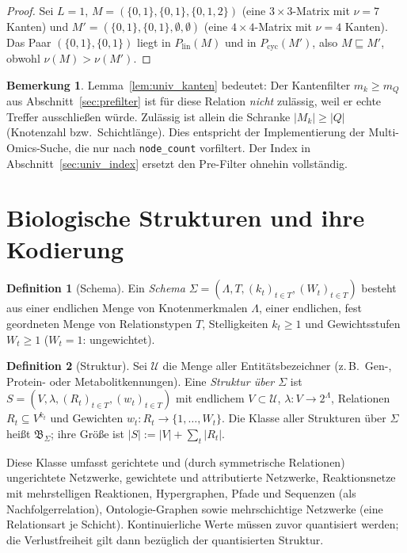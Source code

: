 \documentclass[a4paper,12pt, twoside]{report}
\theoremstyle{definition}
\newtheorem{definition}{Definition}
\newtheorem{bemerkung}{Bemerkung}
\begin{document}
\begin{proof}
	Sei $L=1$, $M=(\{0,1\},\{0,1\},\{0,1,2\})$ (eine $3\times3$-Matrix mit $\nu=7$ Kanten) und $M'=(\{0,1\},\{0,1\},\emptyset,\emptyset)$ (eine $4\times4$-Matrix mit $\nu=4$ Kanten). Das Paar $(\{0,1\},\{0,1\})$ liegt in $P_{\mathrm{lin}}(M)$ und in $P_{\mathrm{cyc}}(M')$, also $M\sqsubseteq M'$, obwohl $\nu(M)>\nu(M')$.
\end{proof}

\begin{bemerkung}
	Lemma~\ref{lem:univ_kanten} bedeutet: Der Kantenfilter $m_k\ge m_Q$ aus Abschnitt~\ref{sec:prefilter} ist für diese Relation \emph{nicht} zulässig, weil er echte Treffer ausschließen würde. Zulässig ist allein die Schranke $|M_k|\ge|Q|$ (Knotenzahl bzw.\ Schichtlänge). Dies entspricht der Implementierung der Multi-Omics-Suche, die nur nach \texttt{node\_count} vorfiltert. Der Index in Abschnitt~\ref{sec:univ_index} ersetzt den Pre-Filter ohnehin vollständig.
\end{bemerkung}

\section{Biologische Strukturen und ihre Kodierung}
\label{sec:univ_kodierung}

\begin{definition}[Schema]
	Ein \emph{Schema} $\Sigma=(\Lambda,T,(k_t)_{t\in T},(W_t)_{t\in T})$ besteht aus einer endlichen Menge von Knotenmerkmalen $\Lambda$, einer endlichen, fest geordneten Menge von Relationstypen $T$, Stelligkeiten $k_t\ge1$ und Gewichtsstufen $W_t\ge1$ ($W_t=1$: ungewichtet).
\end{definition}

\begin{definition}[Struktur]
	Sei $\mathcal{U}$ die Menge aller Entitätsbezeichner (z.\,B.\ Gen-, Protein- oder Metabolitkennungen). Eine \emph{Struktur über $\Sigma$} ist $S=(V,\lambda,(R_t)_{t\in T},(w_t)_{t\in T})$ mit endlichem $V\subset\mathcal{U}$, $\lambda:V\to 2^{\Lambda}$, Relationen $R_t\subseteq V^{k_t}$ und Gewichten $w_t:R_t\to\{1,\dots,W_t\}$. Die Klasse aller Strukturen über $\Sigma$ heißt $\mathfrak{B}_\Sigma$; ihre Größe ist $|S|:=|V|+\sum_t|R_t|$.
\end{definition}

Diese Klasse umfasst gerichtete und (durch symmetrische Relationen) ungerichtete Netzwerke, gewichtete und attributierte Netzwerke, Reaktionsnetze mit mehrstelligen Reaktionen, Hypergraphen, Pfade und Sequenzen (als Nachfolgerrelation), Ontologie-Graphen sowie mehrschichtige Netzwerke (eine Relationsart je Schicht). Kontinuierliche Werte müssen zuvor quantisiert werden; die Verlustfreiheit gilt dann bezüglich der quantisierten Struktur.
\end{document}
